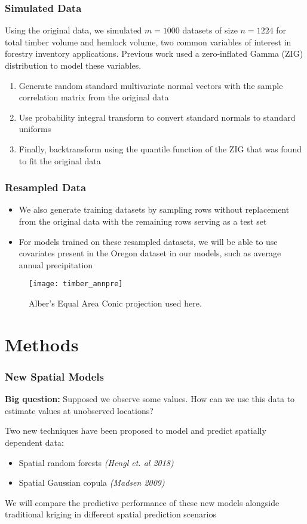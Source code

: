 \documentclass{beamer}
\begin{document}
\begin{frame}
	\frametitle{Simulated Data}
	Using the original data, we simulated $m=1000$ datasets of size $n=1224$ for total timber volume and hemlock volume, two common variables of interest in forestry inventory applications.
	Previous work used a zero-inflated Gamma (ZIG) distribution to model these variables\cite{madsen09}.
	\begin{enumerate}
		\item Generate random standard multivariate normal vectors with the sample correlation matrix from the original data
		\item Use probability integral transform to convert standard normals to standard uniforms
		\item Finally, backtransform using the quantile function of the ZIG that was found to fit the original data
	\end{enumerate}
\end{frame}

\begin{frame}
	\frametitle{Resampled Data}
	\begin{itemize}
		\item We also generate training datasets by sampling rows without replacement from the original data with the remaining rows serving as a test set
		\item For models trained on these resampled datasets, we will be able to use covariates present in the Oregon dataset in our models, such as average annual precipitation
	\end{itemize}
	\begin{center}
		\begin{figure}[ht]
			\texttt{[image: timber\_annpre]}
			\caption{Alber's Equal Area Conic projection used here.}
		\end{figure}
	\end{center}
\end{frame}

\section{Methods}
\begin{frame}
	\frametitle{New Spatial Models}
		\textbf{Big question:} Supposed we observe some values. How can we use this data to estimate values at unobserved locations?
		\vspace{.2cm}

		Two new techniques have been proposed to model and predict spatially dependent data:
	\begin{itemize} 
		\item Spatial random forests \textit{(Hengl et. al 2018)}
		\item Spatial Gaussian copula \textit{(Madsen 2009)}
	\end{itemize}
		We will compare the predictive performance of these new models alongside traditional kriging in different spatial prediction scenarios
\end{frame}
\end{document}
